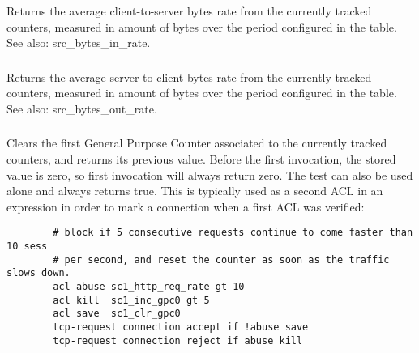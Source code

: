 \subsubsection[sc2\_bytes\_in\_rate]{}
  Returns the average client-to-server bytes rate from the currently tracked
  counters, measured in amount of bytes over the period configured in the
  table.
See also: src\_bytes\_in\_rate.

\subsubsection[sc1\_bytes\_out\_rate]{}
\subsubsection[sc2\_bytes\_out\_rate]{}
  Returns the average server-to-client bytes rate from the currently tracked
  counters, measured in amount of bytes over the period configured in the
  table.
See also: src\_bytes\_out\_rate.

\subsubsection[sc1\_clr\_gpc0]{}
\subsubsection[sc2\_clr\_gpc0]{}
  Clears the first General Purpose Counter associated to the currently tracked
  counters, and returns its previous value. Before the first invocation, the
  stored value is zero, so first invocation will always return zero. The test
  can also be used alone and always returns true. This is typically used as a
  second ACL in an expression in order to mark a connection when a first ACL
  was verified:
  
  \begin{verbatim}
        # block if 5 consecutive requests continue to come faster than 10 sess
        # per second, and reset the counter as soon as the traffic slows down.
        acl abuse sc1_http_req_rate gt 10
        acl kill  sc1_inc_gpc0 gt 5
        acl save  sc1_clr_gpc0
        tcp-request connection accept if !abuse save
        tcp-request connection reject if abuse kill
  \end{verbatim}

